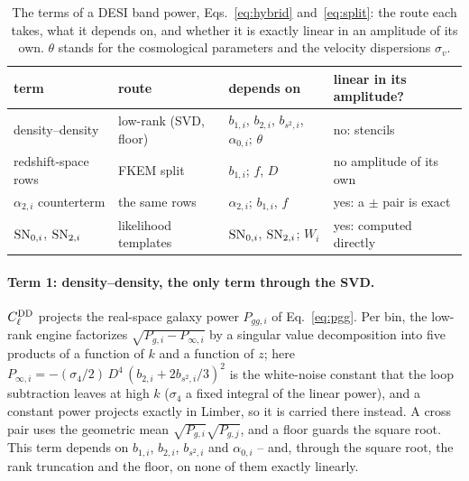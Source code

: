 \documentclass[11pt]{article}
\newcommand{\SNzi}{{\rm SN}_{0,i}}
\newcommand{\SNti}{{\rm SN}_{2,i}}
\begin{document}
\begin{table}[tbp]
  \centering
  \small
  \begin{tabular}{llll}
    \hline
    term & route & depends on & linear in its amplitude? \\
    \hline
    density--density & low-rank (SVD, floor) &
      $b_{1,i}$, $b_{2,i}$, $b_{s^2,i}$, $\alpha_{0,i}$; $\theta$ &
      no: stencils \\
    redshift-space rows & FKEM split & $b_{1,i}$; $f$, $D$ &
      no amplitude of its own \\
    $\alpha_{2,i}$ counterterm & the same rows &
      $\alpha_{2,i}$; $b_{1,i}$, $f$ &
      yes: a $\pm$ pair is exact \\
    $\SNzi$, $\SNti$ & likelihood templates & $\SNzi$, $\SNti$; $W_i$ &
      yes: computed directly \\
    \hline
  \end{tabular}
  \caption{The terms of a DESI band power, Eqs.~\eqref{eq:hybrid}
    and~\eqref{eq:split}: the route each takes, what it depends on,
    and whether it is exactly linear in an amplitude of its own.
    $\theta$ stands for the cosmological parameters and the velocity
    dispersions $\sigma_v$.}
  \label{tab:routes}
\end{table}

\paragraph{Term 1: density--density, the only term through the SVD.}
$C_\ell^{\rm DD}$ projects the real-space galaxy power $P_{gg,i}$ of
Eq.~\eqref{eq:pgg}.  Per bin, the low-rank engine factorizes
$\sqrt{P_{g,i} - P_{\infty,i}}$ by a singular value decomposition into
five products of a function of $k$ and a function of $z$; here
$P_{\infty,i} = -(\sigma_4/2)\,D^4\,(b_{2,i} + 2 b_{s^2,i}/3)^2$ is
the white-noise constant that the loop subtraction leaves at high $k$
($\sigma_4$ a fixed integral of the linear power), and a constant
power projects exactly in Limber, so it is carried there instead.  A
cross pair uses the geometric mean $\sqrt{P_{g,i}}\sqrt{P_{g,j}}$, and
a floor guards the square root.  This term depends on $b_{1,i}$,
$b_{2,i}$, $b_{s^2,i}$ and $\alpha_{0,i}$ -- and, through the square
root, the rank truncation and the floor, on none of them exactly
linearly.
\end{document}
